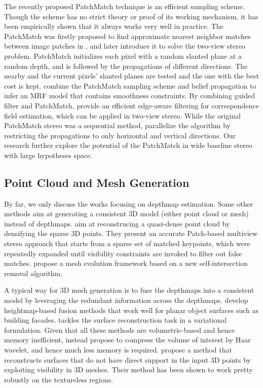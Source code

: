 The recently proposed PatchMatch technique is an efficient sampling scheme. Though the scheme has no strict theory or proof of its working mechanism, it has been empirically shown that it always works very well in practice. The PatchMatch was firstly proposed to find approximate nearest neighbor matches between image patches in \citet{Barnes:2009:PAR}, and later \citet{patchMatchStereo1} introduce it to solve the two-view stereo problem. PatchMatch initializes each pixel with a random slanted plane at a random depth, and is followed by the propagations of different directions. The nearby and the current pixels' slanted planes are tested and the one with the best cost is kept. \citet{patchMatchStereo2} combine the PatchMatch sampling scheme and belief propagation to infer an MRF model that contains smoothness constraints.
By combining guided filter and PatchMatch, \citet{PMF_Hongsheng} provide an efficient edge-aware filtering for correspondence field estimation, which can be applied in two-view stereo.
While the original PatchMatch stereo was a sequential method, \citet{patchMatchParallel} parallelize the algorithm by restricting the propagations to only horizontal and vertical directions. Our research further explore the potential of the PatchMatch in wide baseline stereo with large hypotheses space.

\subsection{Point Cloud and Mesh Generation}
By far, we only discuss the works focusing on depthmap estimation. Some other methods aim at generating a consistent 3D model (either point cloud or mesh) instead of depthmaps. 
\citet{FURUKAWA_PAMI2010} aim at reconstrucing a quasi-dense point cloud by densifying the sparse 3D points. They present an accurate Patch-based multiview stereo approach that starts from a sparse set of matched keypoints, which were repeatedly expanded until visibility constraints are invoked to filter out false matches. \citet{Zaharescu_PAMI2011} propose a mesh evolution framework based on a new self-intersection removal algorithm. 

A typical way for 3D mesh generation is to fuse the depthmaps into a consistent model by leveraging the redundant information across the depthmaps. \citet{gallup20103d,gallup2010heightmap} develop heightmap-based fusion methods that work well for planar object surfaces such as building facades. \citet{zach2008fast} tackles the surface reconstruction task in a variational formulation.
Given that all these methods are volumetric-based and hence memory inefficient, \citet{zheng2012efficient} instead propose to compress the volume of interest by Haar wavelet, and hence much less memory is required. \citet{JAN} propose a method that reconstructs surfaces that do not have direct support in the input 3D points by exploiting visibility in 3D meshes. Their method has been shown to work pretty robustly on the textureless regions.

